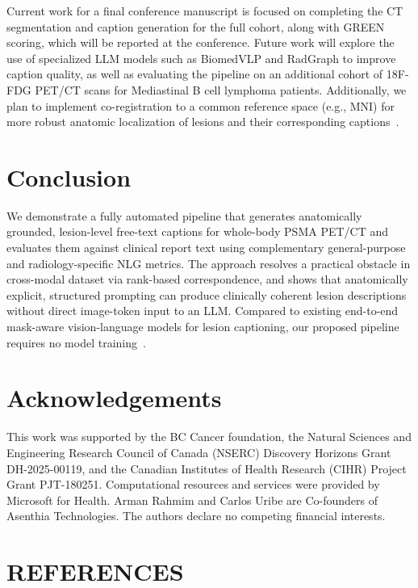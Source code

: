 \documentclass[10pt]{article}
\begin{document}
Current work for a final conference manuscript is focused on completing the CT segmentation and caption generation for the full cohort, along with GREEN scoring, which will be reported at the conference. Future work will explore the use of specialized LLM models such as BiomedVLP and RadGraph to improve caption quality, as well as evaluating the pipeline on an additional cohort of 18F-FDG PET/CT scans for Mediastinal B cell lymphoma patients. Additionally, we plan to implement co-registration to a common reference space (e.g., MNI) for more robust anatomic localization of lesions and their corresponding captions~\cite{ref:llm_rad_survey,ref:radgraph}.


\section*{Conclusion}
We demonstrate a fully automated pipeline that generates anatomically grounded, lesion-level free-text captions for whole-body PSMA PET/CT and evaluates them against clinical report text using complementary general-purpose and radiology-specific NLG metrics. The approach resolves a practical obstacle in cross-modal dataset via rank-based correspondence, and shows that anatomically explicit, structured prompting can produce clinically coherent lesion descriptions without direct image-token input to an LLM. Compared to existing end-to-end mask-aware vision-language models for lesion captioning, our proposed pipeline requires no model training~\cite{ref:petar,ref:med_flamingo}.


\section*{Acknowledgements}
This work was supported by the BC Cancer foundation, the Natural Sciences and Engineering Research Council of Canada (NSERC) Discovery Horizons Grant DH-2025-00119, and the Canadian Institutes of Health Research (CIHR) Project Grant PJT-180251. Computational resources and services were provided by Microsoft for Health. Arman Rahmim and Carlos Uribe are Co-founders of Asenthia Technologies. The authors declare no competing financial interests.


\section*{REFERENCES}
\end{document}
